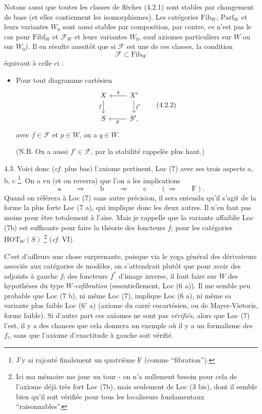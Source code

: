 \documentclass[11pt]{article}
\newcommand{\printedpage}[1]{\marginpar{\footnotesize p.~#1}}
\newcommand{\msp}[1]{\marginpar{\footnotesize [#1]}}
\newcommand{\Fib}{\mathrm{Fib}}
\newcommand{\Fibf}{\mathrm{Fibf}}
\newcommand{\Parf}{\mathrm{Parf}}
\newcommand{\HOT}{\mathrm{HOT}}
\begin{document}
Notons aussi que toutes les classes de flèches (4.2.1) sont stables par changement de base (et elles contiennent les isomorphismes). Les catégories $\Fib_W$, $\Parf_W$ et leurs variantes $W_0$ sont aussi stables par composition, par contre, ce n'est pas le cas pour $\Fibf_W$ et $\mathcal{F}_W$ et leurs variantes $W_0$, sauf axiomes particuliers sur $W$ ou sur $W_0$). Il en résulte aussitôt \msp{page 36} que si $\mathcal{F}$ est une de ces classes, la condition %
\[
\mathcal{F} \subset \Fib_W
\]
équivaut à celle ci :

\begin{itemize}[label={},leftmargin=3.5cm]
\item Pour tout diagramme cartésien
\[
\begin{tikzcd}
X \arrow[d, "f"'] & X' \arrow[l, "q"'] \arrow[d, "f'"] \\
S & S', \arrow[l, "p"]
\end{tikzcd}
\tag*{(4.2.2)}
\]
avec $f \in \mathcal{F}$ et $p \in W$, on a $q \in W$.

(N.B. On a aussi $f' \in \mathcal{F}$, par la stabilité rappelée plus haut.)
\end{itemize}

4.3. Voici donc (\textit{cf.} plus bas) l'axiome pertinent, Loc (7) avec ses trois aspects a, b, c \footnote[23]{J'y ai rajouté finalement un quatrième F (comme “fibration”).}. On a vu (et on reverra) que l'on a les implications
\[
\text{a} \qquad \Longrightarrow \qquad \text{b} \qquad \Longrightarrow \qquad \text{c} \qquad (\Longrightarrow \qquad \text{F}).
\]
Quand on référera à Loc (7) sans autre précision, il sera entendu qu'il s'agit de la forme la plus forte Loc (7 a), qui implique donc les deux autres. Il n'en faut pas moins pour être totalement à l'aise. Mais je rappelle que la variante affaiblie Loc (7b) est suffisante pour faire la théorie des foncteurs $f_!$ pour les catégories $\HOT_W(S)$ \footnote[24]{Ici ma mémoire me joue un tour - on n'a nullement besoin pour cela de l'axiome déjà très fort Loc (7b), mais seulement de Loc (3 bis), dont il semble bien qu'il soit vérifiée pour tous les localiseurs fondamentaux “raisonnables”. %
} (\textit{cf.} VI).

\msp{page 37}

C'est d'ailleurs une chose surprenante, puisque via le yoga général des dérivateurs associés aux catégories de modèles, on s'attendrait plutôt que pour avoir des adjoints à gauche $f_!$ des foncteurs $f^*$ d'image inverse, il faut faire sur $W$ des hypothèses du type \textit{$W$-cofibration}
\printedpage{23}
(essentiellement, Loc (6 a)). Il me semble peu probable que Loc (7 b), ni même Loc (7), implique Loc (6 a), ni même sa variante plus faible Loc (6$'$ a) (axiome du carré cocartésien, ou de Mayer-Vietoris, forme faible). Si d'autre part ces axiomes ne sont pas \textit{vérifiés,} alors que Loc (7) l'est, il y a des chances que cela donnera un exemple où il y a un formalisme des $f_!$, sans que l'axiome d'exactitude à gauche soit vérifié.
\end{document}
